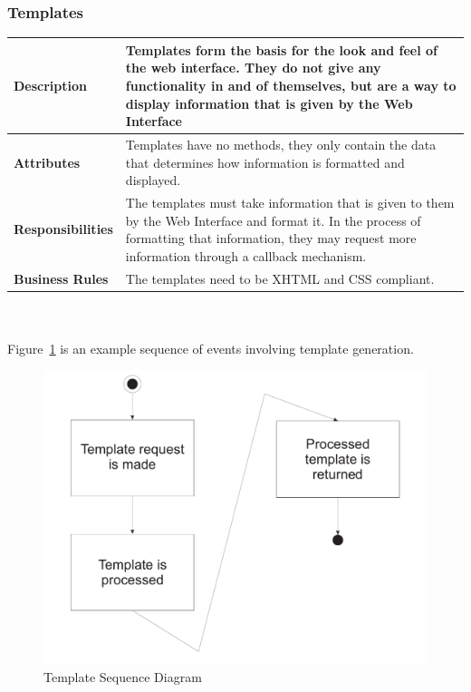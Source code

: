 \documentclass[12pt,titlepage]{article}
\begin{document}
\subsubsection{Templates}
\begin{tabular}{|p{}|p{}|}
	\hline
	\textbf{Description} & Templates form the basis for the look and feel of the web interface.  They do not give any functionality in and of themselves, but are a way to display information that is given by the Web Interface\\
	\hline
	\textbf{Attributes} & Templates have no methods, they only contain the data that determines how information is formatted and displayed.\\
	\hline
	\textbf{Responsibilities} & The templates must take information that is given to them by the Web Interface and format it.  In the process of formatting that information, they may request more information through a callback mechanism.\\
	\hline
	\textbf{Business Rules} & The templates need to be XHTML and CSS compliant. \\
	\hline
\end{tabular}
\\
\\
Figure~\ref{TemplateSequenceDiagram} is an example sequence of events involving template generation.
\begin{figure}[h]
	\centering
	\includegraphics[width=.5\textwidth]{TemplateSequenceDiagram}
	\caption{Template Sequence Diagram}
	\label{TemplateSequenceDiagram}
\end{figure}
\end{document}
